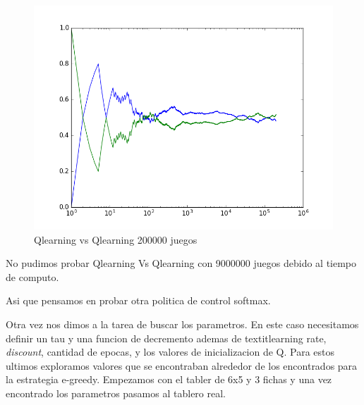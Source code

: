 \begin{figure}[h]
 \centering
 \begin{minipage}{.45\textwidth}	  
	\centering	
	\includegraphics[scale=0.35]{img/QlearningQlearningEgreedy2000007x6(4).png}
       \caption{Qlearning vs Qlearning 200000 juegos}
  \end{minipage}
\end{figure}

No pudimos probar Qlearning Vs Qlearning con 9000000 juegos debido al tiempo de computo. 


Asi que pensamos en probar otra politica de control softmax. 

Otra vez nos dimos a la tarea de buscar los parametros. En este caso necesitamos definir un tau y una funcion de decremento ademas de textit{learning rate}, \textit{discount}, cantidad de epocas, y los valores de inicializacion de Q. Para estos ultimos exploramos valores que se encontraban alrededor de los encontrados para la estrategia e-greedy. 
Empezamos con el tabler de 6x5 y 3 fichas y una vez encontrado los parametros pasamos al tablero real. 





 